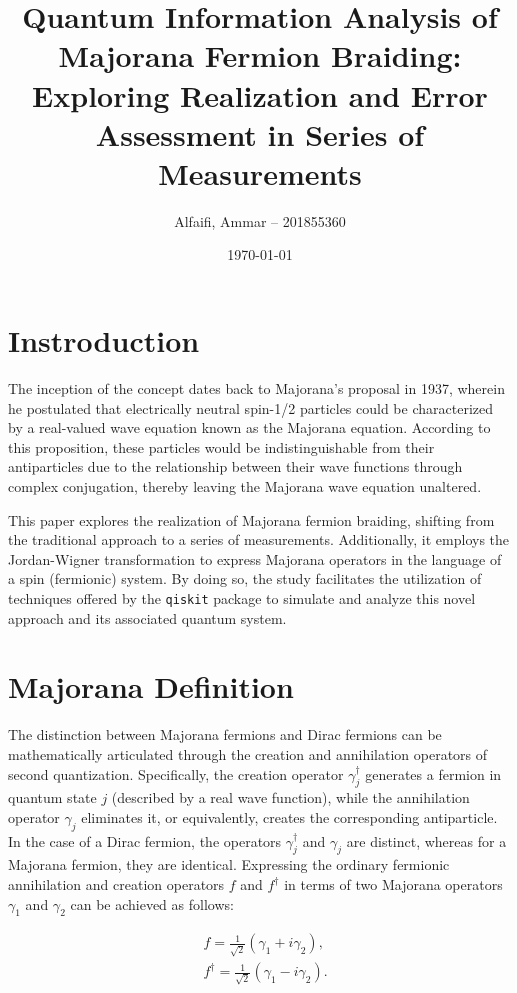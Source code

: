 \documentclass{article}
\title{Quantum Information Analysis of Majorana Fermion Braiding: Exploring Realization and Error Assessment in Series of Measurements}
\author{Alfaifi, Ammar -- 201855360}
\date{\today}
\def\c#1{\texttt{#1}}
\begin{document}
\maketitle

\section{Instroduction} %
\label{sec:Instroduction}
The inception of the concept dates back to Majorana's proposal in 1937, wherein he postulated that electrically neutral spin-1/2 particles could be characterized by a real-valued wave equation known as the Majorana equation. According to this proposition, these particles would be indistinguishable from their antiparticles due to the relationship between their wave functions through complex conjugation, thereby leaving the Majorana wave equation unaltered.

This paper explores the realization of Majorana fermion braiding, shifting from the traditional approach to a series of measurements. Additionally, it employs the Jordan-Wigner transformation to express Majorana operators in the language of a spin (fermionic) system. By doing so, the study facilitates the utilization of techniques offered by the \c{qiskit} package to simulate and analyze this novel approach and its associated quantum system.

\section{Majorana Definition} %
\label{sec:Majorana Definition}
The distinction between Majorana fermions and Dirac fermions can be mathematically articulated through the creation and annihilation operators of second quantization. Specifically, the creation operator $\gamma_j^{\dagger}$ generates a fermion in quantum state $j$ (described by a real wave function), while the annihilation operator $\gamma_j$ eliminates it, or equivalently, creates the corresponding antiparticle. In the case of a Dirac fermion, the operators $\gamma_j^{\dagger}$ and $\gamma_j$ are distinct, whereas for a Majorana fermion, they are identical. Expressing the ordinary fermionic annihilation and creation operators $f$ and $f^{\dagger}$ in terms of two Majorana operators $\gamma_1$ and $\gamma_2$ can be achieved as follows:

$$
	\begin{aligned}
		 & f=\frac{1}{\sqrt{2}}\left(\gamma_1+i \gamma_2\right),            \\
		 & f^{\dagger}=\frac{1}{\sqrt{2}}\left(\gamma_1-i \gamma_2\right) .
	\end{aligned}
$$
\end{document}
